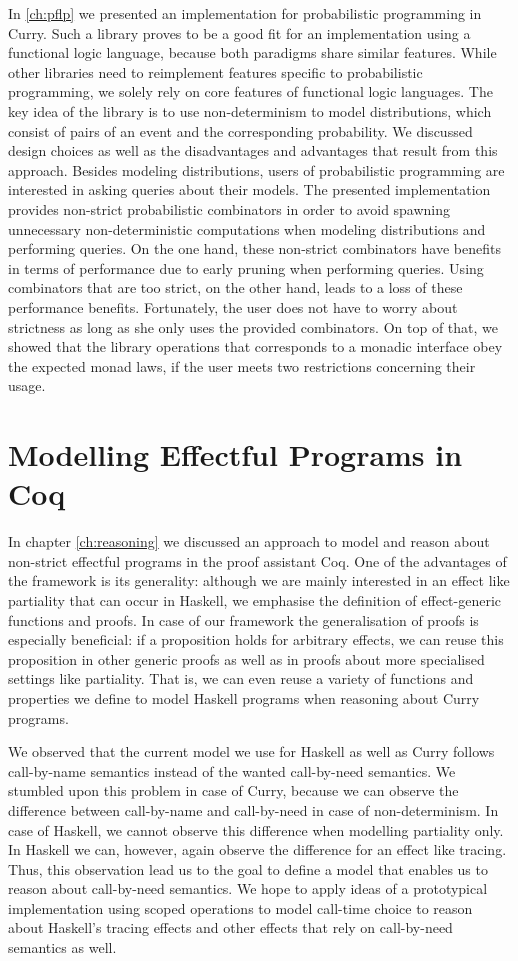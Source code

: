 In \autoref{ch:pflp} we presented an implementation for probabilistic programming in Curry.
Such a library proves to be a good fit for an implementation using a functional logic language, because both paradigms share similar features.
While other libraries need to reimplement features specific to probabilistic programming, we solely rely on core features of functional logic languages.
The key idea of the library is to use non-determinism to model distributions, which consist of pairs of an event and the corresponding probability.
We discussed design choices as well as the disadvantages and advantages that result from this approach.
Besides modeling distributions, users of probabilistic programming are interested in asking queries about their models.
The presented implementation provides non-strict probabilistic combinators in order to avoid spawning unnecessary non-deterministic computations when modeling distributions and performing queries.
On the one hand, these non-strict combinators have benefits in terms of performance due to early pruning when performing queries.
Using combinators that are too strict, on the other hand, leads to a loss of these performance benefits.
Fortunately, the user does not have to worry about strictness as long as she only uses the provided combinators.
On top of that, we showed that the library operations that corresponds to a monadic interface obey the expected monad laws, if the user meets two restrictions concerning their usage.

\section{Modelling Effectful Programs in Coq}

In chapter \autoref{ch:reasoning} we discussed an approach to model and reason about non-strict effectful programs in the proof assistant Coq.
One of the advantages of the framework is its generality: although we are mainly interested in an effect like partiality that can occur in Haskell, we emphasise the definition of effect-generic functions and proofs.
In case of our framework the generalisation of proofs is especially beneficial: if a proposition holds for arbitrary effects, we can reuse this proposition in other generic proofs as well as in proofs about more specialised settings like partiality.
That is, we can even reuse a variety of functions and properties we define to model Haskell programs when reasoning about Curry programs.

We observed that the current model we use for Haskell as well as Curry follows call-by-name semantics instead of the wanted call-by-need semantics.
We stumbled upon this problem in case of Curry, because we can observe the difference between call-by-name and call-by-need in case of non-determinism.
In case of Haskell, we cannot observe this difference when modelling partiality only.
In Haskell we can, however, again observe the difference for an effect like tracing.
Thus, this observation lead us to the goal to define a model that enables us to reason about call-by-need semantics.
We hope to apply ideas of a prototypical implementation using scoped operations to model call-time choice to reason about Haskell's tracing effects and other effects that rely on call-by-need semantics as well.
